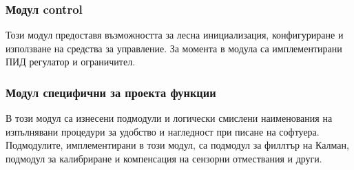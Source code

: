 \subsubsection{Модул control}

Този модул предоставя възможността за лесна инициализация,
конфигуриране и използване на средства за управление.
За момента в модула са имплементирани ПИД регулатор и ограничител.

\subsubsection{Модул специфични за проекта функции}

В този модул са изнесени подмодули и логически смислени наименования на изпълнявани процедури
за удобство и нагледност при писане на софтуера.
Подмодулите, имплементирани в този модул, са подмодул за филлтър на Калман,
подмодул за калибриране и компенсация на сензорни отмествания и други.